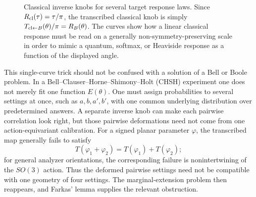 \documentclass[aps,pra,reprint,superscriptaddress,nofootinbib,floatfix]{revtex4-2}
\begin{document}
\begin{figure}[htbp]
\centering
{}
\caption{Classical inverse knobs for several target response laws.  Since
\(R_{\rm cl}(\tau)=\tau/\pi\), the transcribed classical knob is simply
\(T_{{\rm cl}\leftarrow B}(\theta)/\pi=R_B(\theta)\).  The curves show how a
linear classical response must be read on a generally
non-symmetry-preserving scale in order to mimic a quantum, softmax, or
Heaviside response as a function of the displayed angle.}
\label{fig:inverse-knobs}
\end{figure}

This single-curve trick should not be confused with a solution of a Bell or
Boole problem.  In a Bell--Clauser--Horne--Shimony--Holt (CHSH) experiment one
does not merely fit one function \(E(\theta)\).  One must assign probabilities
to several settings at once, such as \(a,b,a',b'\), with one common
underlying distribution over predetermined answers.  A separate inverse knob
can make each pairwise correlation look right, but those pairwise
deformations need not come from one action-equivariant calibration.  For a
signed planar parameter \(\varphi\), the transcribed map generally fails to
satisfy
\[
        T(\varphi_1+\varphi_2)
        =
        T(\varphi_1)+T(\varphi_2);
\]
for general analyzer orientations, the corresponding failure is
nonintertwining of the \(SO(3)\) action.  Thus the deformed pairwise settings
need not be compatible with one geometry of four settings.  The
marginal-extension problem then reappears, and Farkas' lemma supplies the
relevant obstruction.
\end{document}
